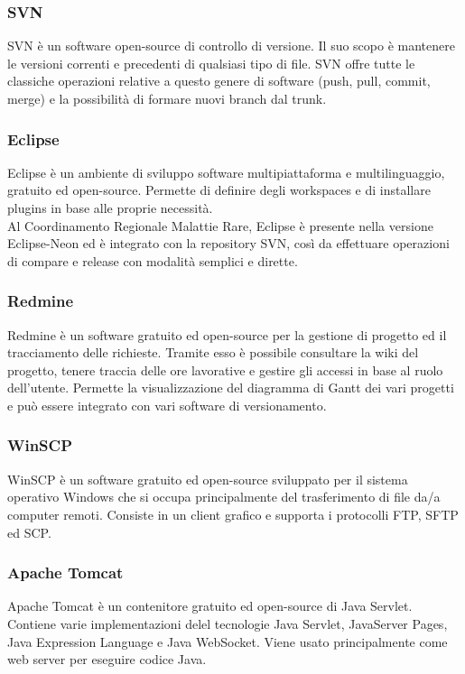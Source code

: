 \documentclass[a4paper]{article}
\newcommand{\crmr}{Coordinamento Regionale Malattie Rare}
\begin{document}
\subsubsection{SVN}
SVN è un software open-source di controllo di versione. Il suo scopo è mantenere le versioni correnti e precedenti di qualsiasi tipo di file. SVN offre tutte le classiche operazioni relative a questo genere di software (push, pull, commit, merge) e la possibilità di formare nuovi branch dal trunk.

\subsubsection{Eclipse}
Eclipse è un ambiente di sviluppo software multipiattaforma e multilinguaggio, gratuito ed open-source. Permette di definire degli workspaces e di installare plugins in base alle proprie necessità. 
\\
Al \crmr, Eclipse è presente nella versione Eclipse-Neon ed è integrato con la repository SVN, così da effettuare operazioni di compare e release con modalità semplici e dirette.

\subsubsection{Redmine}
Redmine è un software gratuito ed open-source per la gestione di progetto ed il tracciamento delle richieste. Tramite esso è possibile consultare la wiki del progetto, tenere traccia delle ore lavorative e gestire gli accessi in base al ruolo dell'utente. Permette la visualizzazione del diagramma di Gantt dei vari progetti e può essere integrato con vari software di versionamento.

\subsubsection{WinSCP}
WinSCP è un software gratuito ed open-source sviluppato per il sistema operativo Windows che si occupa principalmente del trasferimento di file da/a computer remoti. Consiste in un client grafico e supporta i protocolli FTP, SFTP ed SCP.

\subsubsection{Apache Tomcat}
Apache Tomcat è un contenitore gratuito ed open-source di Java Servlet. Contiene varie implementazioni delel tecnologie Java Servlet, JavaServer Pages, Java Expression Language e Java WebSocket. Viene usato principalmente come web server per eseguire codice Java.
\end{document}
